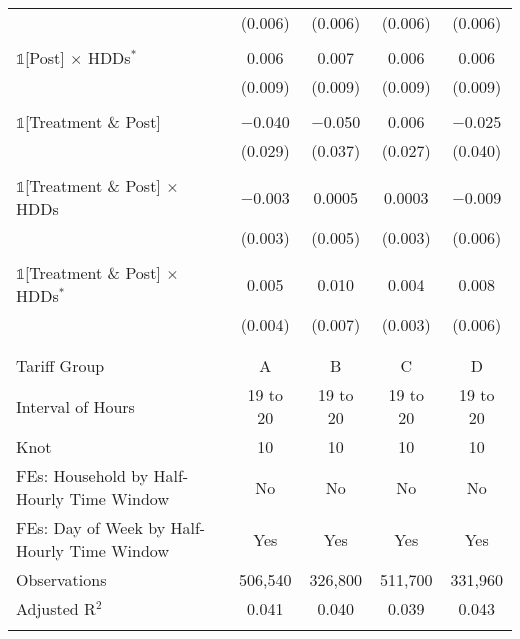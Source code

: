 \begin{table}[!htbp]
\begin{tabular}{@{\extracolsep{30pt}}lcccc}
  & (0.006) & (0.006) & (0.006) & (0.006) \\ 
  & & & & \\ 
 $\mathbb{1}$[Post] $\times$ HDDs$^{*}$ & 0.006 & 0.007 & 0.006 & 0.006 \\ 
  & (0.009) & (0.009) & (0.009) & (0.009) \\ 
  & & & & \\ 
 $\mathbb{1}$[Treatment \& Post] & $-$0.040 & $-$0.050 & 0.006 & $-$0.025 \\ 
  & (0.029) & (0.037) & (0.027) & (0.040) \\ 
  & & & & \\ 
 $\mathbb{1}$[Treatment \& Post] $\times$ HDDs & $-$0.003 & 0.0005 & 0.0003 & $-$0.009 \\ 
  & (0.003) & (0.005) & (0.003) & (0.006) \\ 
  & & & & \\ 
 $\mathbb{1}$[Treatment \& Post] $\times$ HDDs$^{*}$ & 0.005 & 0.010 & 0.004 & 0.008 \\ 
  & (0.004) & (0.007) & (0.003) & (0.006) \\ 
  & & & & \\ 
\hline \\[-1.8ex] 
Tariff Group & A & B & C & D \\ 
Interval of Hours & 19 to 20 & 19 to 20 & 19 to 20 & 19 to 20 \\ 
Knot & 10 & 10 & 10 & 10 \\ 
FEs: Household by Half-Hourly Time Window & No & No & No & No \\ 
FEs: Day of Week by Half-Hourly Time Window & Yes & Yes & Yes & Yes \\ 
Observations & 506,540 & 326,800 & 511,700 & 331,960 \\ 
Adjusted R$^{2}$ & 0.041 & 0.040 & 0.039 & 0.043 \\ 
\hline 
\hline \\[-1.8ex] 
\end{tabular} 
\end{table} 
